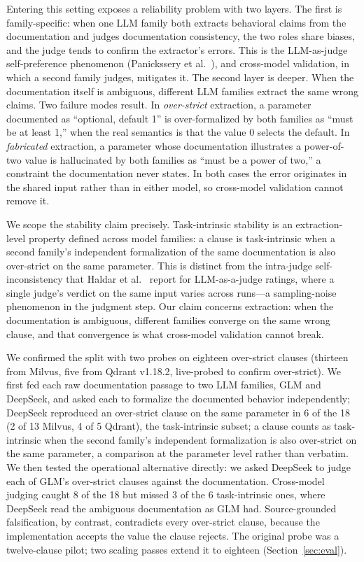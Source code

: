 \documentclass[sigconf]{acmart}
\begin{document}
Entering this setting exposes a reliability problem with two layers. The first is family-specific: when one LLM family both extracts behavioral claims from the documentation and judges documentation consistency, the two roles share biases, and the judge tends to confirm the extractor's errors. This is the LLM-as-judge self-preference phenomenon (Panickssery et al.~\cite{panickssery24}), and cross-model validation, in which a second family judges, mitigates it. The second layer is deeper. When the documentation itself is ambiguous, different LLM families extract the same wrong claims. Two failure modes result. In \emph{over-strict} extraction, a parameter documented as ``optional, default 1'' is over-formalized by both families as ``must be at least 1,'' when the real semantics is that the value 0 selects the default. In \emph{fabricated} extraction, a parameter whose documentation illustrates a power-of-two value is hallucinated by both families as ``must be a power of two,'' a constraint the documentation never states. In both cases the error originates in the shared input rather than in either model, so cross-model validation cannot remove it.

We scope the stability claim precisely. Task-intrinsic stability is an extraction-level property defined across model families: a clause is task-intrinsic when a second family's independent formalization of the same documentation is also over-strict on the same parameter. This is distinct from the intra-judge self-inconsistency that Haldar et al.~\cite{haldar25} report for LLM-as-a-judge ratings, where a single judge's verdict on the same input varies across runs---a sampling-noise phenomenon in the judgment step. Our claim concerns extraction: when the documentation is ambiguous, different families converge on the same wrong clause, and that convergence is what cross-model validation cannot break.

We confirmed the split with two probes on eighteen over-strict clauses (thirteen from Milvus, five from Qdrant v1.18.2, live-probed to confirm over-strict). We first fed each raw documentation passage to two LLM families, GLM and DeepSeek, and asked each to formalize the documented behavior independently; DeepSeek reproduced an over-strict clause on the same parameter in 6 of the 18 (2 of 13 Milvus, 4 of 5 Qdrant), the task-intrinsic subset; a clause counts as task-intrinsic when the second family's independent formalization is also over-strict on the same parameter, a comparison at the parameter level rather than verbatim. We then tested the operational alternative directly: we asked DeepSeek to judge each of GLM's over-strict clauses against the documentation. Cross-model judging caught 8 of the 18 but missed 3 of the 6 task-intrinsic ones, where DeepSeek read the ambiguous documentation as GLM had. Source-grounded falsification, by contrast, contradicts every over-strict clause, because the implementation accepts the value the clause rejects. The original probe was a twelve-clause pilot; two scaling passes extend it to eighteen (Section~\ref{sec:eval}).
\end{document}
